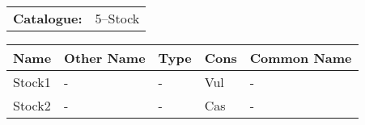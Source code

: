 \begin{tabular}{ p{0.9in} p{1.3in}}
{\bf Catalogue:} & 5--Stock \\ 
\end{tabular}
\centering 
\begin{longtable}{ p{0.7in}  p{1.0in}  p{0.6in}  p{0.9in}  p{4.0in} }
\hline 
{\bf Name} & {\bf Other Name} & {\bf Type} & {\bf Cons} & {\bf Common Name} \\ 
\hline 
Stock1 & - & - & Vul & - \\ 
Stock2 & - & - & Cas & - \\ 
\hline 
\end{longtable} 
